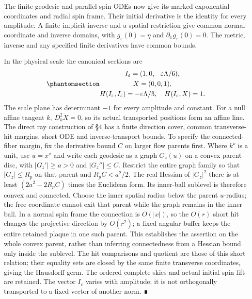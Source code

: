 \documentclass[
  english,
  11pt,
  reqno]{amsart}
\begin{document}
The finite geodesic and parallel-spin ODEs now give its marked
exponential coordinates and radial spin frame. Their initial derivative
is the identity for every amplitude. A finite implicit inverse and a
spatial restriction give common normal-coordinate and inverse domains,
with \(g_\varepsilon(0)=\eta\) and \(\partial_xg_\varepsilon(0)=0\). The
metric, inverse and any specified finite derivatives have common bounds.

In the physical scale the canonical sections are
\begin{equation}\protect\phantomsection\label{eq:gg-common-canonical-sections}{\begin{gathered}
I_\varepsilon=(1,0,-\varepsilon\Lambda/6), \\
X=(0,0,1), \\
H(I_\varepsilon,I_\varepsilon)=-\varepsilon\Lambda/3,\quad
 H(I_\varepsilon,X)=1 .
\end{gathered}}\end{equation} The scale plane has determinant \(-1\) for every
amplitude and constant. For a null affine tangent \(k\), \(D_k^2X=0\),
so its actual transported positions form an affine line. The direct ray
construction of §4 has a finite direction cover, common transverse-hit
margins, short ODE and inverse-transport bounds. To specify the
connected-fiber margin, fix the derivative bound \(C\) on larger flow
parents first. Where \(k^\nu\) is a unit, use \(u=x^\nu\) and write each
geodesic as a graph \(G_z(u)\) on a convex parent disc, with
\(|G_z'|\ge a>0\) and \(|G_z''|\le C\). Restrict the entire graph family
so that \(|G_z|\le R_p\) on that parent and \(R_pC<a^2/2\). The real
Hessian of \(|G_z|^2\) there is at least \((2a^2-2R_pC)\) times the
Euclidean form. Its inner-ball sublevel is therefore convex and
connected. Choose the inner spatial radius below the parent
\(u\)-radius; the free coordinate cannot exit that parent while the
graph remains in the inner ball. In a normal spin frame the connection
is \(O(|x|)\), so the \(O(r)\) short hit changes the projective
direction by \(O(r^2)\); a fixed angular buffer keeps the entire
retained plaque in one such parent. This establishes the assertion on
the whole convex parent, rather than inferring connectedness from a
Hessian bound only inside the sublevel. The hit comparisons and quotient
are those of this short relation; their equality sets are closed by the
same finite transverse coordinates, giving the Hausdorff germ. The
ordered complete skies and actual initial spin lift are retained. The
vector \(I_\varepsilon\) varies with amplitude; it is not orthogonally
transported to a fixed vector of another norm. ∎
\end{document}
